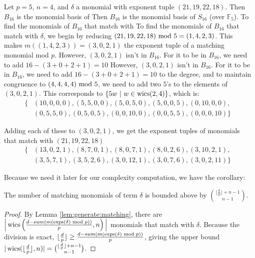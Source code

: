 \begin{ex}
    Let $p = 5$, \(n = 4\), and $\delta$ a monomial 
    with exponent tuple $(21, 19, 22, 18)$. 
    Then $B_{16}$ is the monomial basis of 
    Then $B_{16}$ is the monomial basis of 
    \(S_{16}\) (over $\mathbb{F}_5$). 
    To find the monomials of $B_{16}$ that match with 
    To find the monomials of $B_{16}$ that match with 
    $\delta$, we begin by reducing $(21, 19, 22, 18) \text{ mod } 5 = (1, 4, 2, 3)$.
    This makes $m((1, 4, 2, 3)) = (3, 0, 2, 1)$ the 
    exponent tuple of a matching monomial mod \(p\).
    However, \((3, 0, 2, 1)\) isn't in $B_{16}$. 
    For it to be in $B_{16}$, we need to add $16 - (3 + 0 + 2 + 1) = 10$ 
    However, \((3, 0, 2, 1)\) isn't in $B_{16}$. 
    For it to be in $B_{16}$, we need to add $16 - (3 + 0 + 2 + 1) = 10$ 
    to the degree, and to maintain congruence to 
    $(4, 4, 4, 4) \text{ mod } 5$, we need to add two $5$'s 
    to the elements of $(3, 0, 2, 1)$. This corresponds 
    to $\{5w ~|~ w \in \operatorname{wics}(2, 4)\}$, which is:
    \begin{align*}
        \{&(10, 0, 0, 0), (5, 5, 0, 0), (5, 0, 5, 0), (5, 0, 0, 5), (0, 10, 0, 0), \\
        &(0, 5, 5, 0), (0, 5, 0, 5), (0, 0, 10, 0), (0, 0, 5, 5), (0, 0, 0, 10)\}
    \end{align*}
        
    \noindent Adding each of these to $(3, 0, 2, 1)$, we get the 
    exponent tuples of monomials that match with $(21, 19, 22, 18)$
    \begin{align*}
        \{&(13, 0, 2, 1), (8, 7, 0, 1), (8, 0, 7, 1), (8, 0, 2, 6), (3, 10, 2, 1), \\
        &(3, 5, 7, 1), (3, 5, 2, 6), (3, 0, 12, 1), (3, 0, 7, 6), (3, 0, 2, 11)\}
    \end{align*}    
\end{ex}

Because we need it later for our complexity computation, we have the corollary:

\begin{cor}
    \label{cor:num:matches}
    The number of matching monomials of term $\delta$ is 
    bounded above by $\binom{\lfloor \frac{d}{p} \rfloor + n - 1}{n - 1}$.
\end{cor}

\begin{proof}
    By Lemma \ref{lem:generate:matching}, there are 
    $\Big |\operatorname{wics} \left(\frac{d - sum(m(\operatorname{exps}(\delta) \text{ mod } p))}{p}, n \right) \Big |$ 
    monomials that match with $\delta$.
    Because the division is exact, 
    $\lfloor \frac{d}{p} \rfloor \geq \frac{d - sum(m(\operatorname{exps}(\delta) \text{ mod } p))}{p}$,
    giving the upper bound 
    $|\operatorname{wics}(\lfloor \frac{d}{p} \rfloor, n)| = \binom{\lfloor \frac{d}{p} \rfloor + n - 1}{n - 1}$.
\end{proof}


